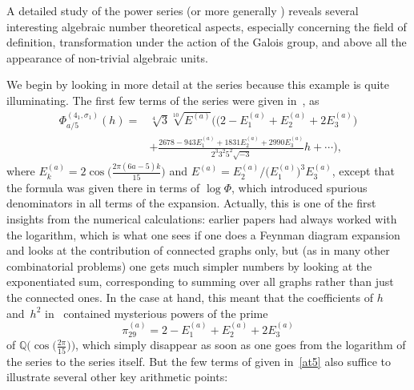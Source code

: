 \documentclass[pdftex]{sigma}
\numberwithin{equation}{section}
\def\a{\alpha}
\def\Q{\mathbb Q}
\def\a{\alpha}
\def\s{\sigma}
\def\vve{E}
\begin{document}
A detailed study of the power series \smash{$\Phi_\a^{(K,\s)}(h)$} (or more generally
\smash{$\Phi_\a^{(K,\s,\s')}(h)$}) reveals several interesting algebraic number theoretical
aspects, especially concerning the field of definition, transformation under the
action of the Galois group, and above all the appearance of non-trivial algebraic units.

We begin by looking in more detail at the series  because this
example is quite illuminating. The first few terms of the series were given
in~\cite[p.\ 670]{Za:QMF}, as
\begin{align}
\Phi^{(4_1,\s_1)}_{a/5}(h)
={}&\sqrt[4]3\sqrt[10]{\vve^{(a)}}
\big(\bigl(2-\vve^{(a)}_1+\vve^{(a)}_2+2\vve^{(a)}_3\bigr)\nonumber \\ &
+ \frac{2678-943\vve^{(a)}_1+1831\vve^{(a)}_2+2990\vve^{(a)}_3}{2^3 3^2 5^2
\sqrt{-3}} h +\cdots\bigg) ,\label{at5}
\end{align}
where $\vve^{(a)}_k=2\cos\bigl(\frac{2\pi(6a-5)k}{15}\bigr)$ and
$\vve^{(a)}=\vve^{(a)}_2/\bigl(\vve^{(a)}_1\bigr)^3\vve^{(a)}_3$,
except that the formula was given there in terms of $\log\Phi$, which
introduced spurious denominators in all terms of the expansion. Actually,
this is one of the first insights from the numerical calculations:
earlier papers had always worked with the logarithm, which is what one sees
if one does a Feynman diagram expansion and looks at the contribution of connected
graphs only, but (as in many other combinatorial problems) one gets much
simpler numbers by looking at the exponentiated sum, corresponding to
summing over all graphs rather than just the connected ones. In the case at hand,
this meant that the coefficients of $h$ and~$h^2$ in~\cite{Za:QMF} contained
mysterious powers of the prime \[\pi_{29}^{(a)} = 2-\vve^{(a)}_1+\vve^{(a)}_2+2\vve^{(a)}_3\]
of $\Q\bigl(\cos\bigl(\frac{2\pi}{15}\bigr)\bigr)$, which simply disappear as
soon as one goes from the logarithm of the series to the series itself. But the
few terms of \smash{$\Phi^{(4_1,\s_1)}_{a/5}(h)$} given in~\eqref{at5} also suffice to illustrate
several other key arithmetic points:
\end{document}
